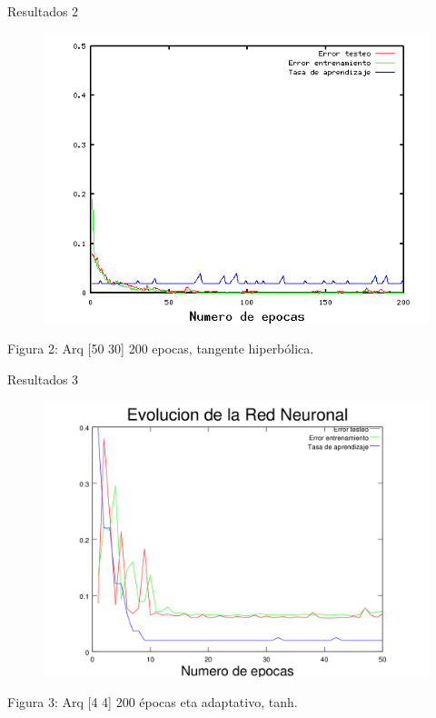 \documentclass{beamer}
\begin{document}
\begin{frame}{Resultados 2}
\begin{figure}[H]
\begin{center}
\includegraphics[scale=0.40]{../images/nice.png}
\label{modelado}
\end{center}
\end{figure}

\begin{center}
\par Figura 2: Arq [50 30] 200 epocas, tangente hiperbólica.
\end{center}
\end{frame}

\begin{frame}{Resultados 3}
\begin{figure}[H]
\begin{center}
\includegraphics[scale=0.40]{../images/9.png}
\label{modelado}
\end{center}
\end{figure}

\begin{center}
\par Figura 3: Arq [4 4] 200 épocas eta adaptativo, tanh.
\end{center}
\end{frame}
\end{document}
